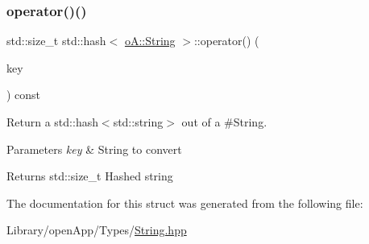 \subsubsection{\texorpdfstring{operator()()}{operator()()}}
{\footnotesize\ttfamily std\+::size\+\_\+t std\+::hash$<$ \mbox{\hyperlink{classo_a_1_1_string}{o\+A\+::\+String}} $>$\+::operator() (\begin{DoxyParamCaption}\item[{const \mbox{\hyperlink{classo_a_1_1_string}{o\+A\+::\+String}} \&}]{key }\end{DoxyParamCaption}) const\hspace{0.3cm}{\ttfamily [inline]}}



Return a std\+::hash$<$std\+::string$>$ out of a \#\+String. 


\begin{DoxyParams}{Parameters}
{\em key} & String to convert \\
\hline
\end{DoxyParams}
\begin{DoxyReturn}{Returns}
std\+::size\+\_\+t Hashed string 
\end{DoxyReturn}


The documentation for this struct was generated from the following file\+:\begin{DoxyCompactItemize}
\item 
Library/open\+App/\+Types/\mbox{\hyperlink{_string_8hpp}{String.\+hpp}}\end{DoxyCompactItemize}
